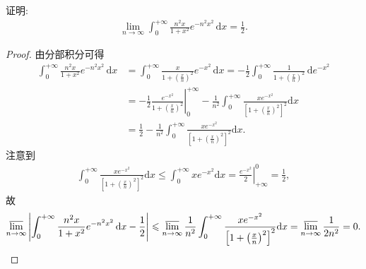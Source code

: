 \documentclass[../../main.tex]{subfiles}%
\begin{document}
\begin{example}
证明:
\begin{align*}
\lim_{n \to \infty} \int_0^{+\infty} \frac{n^2 x}{1 + x^2} e^{-n^2 x^2} \, \mathrm{d}x = \frac{1}{2}.
\end{align*}
\end{example}
\begin{proof}

由分部积分可得
\begin{align*}
\int_0^{+\infty} \frac{n^2 x}{1 + x^2} e^{-n^2 x^2} \, \mathrm{d}x &= \int_0^{+\infty} \frac{x}{1 + \left( \frac{x}{n} \right)^2} e^{-x^2} \, \mathrm{d}x = -\frac{1}{2} \int_0^{+\infty} \frac{1}{1 + \left( \frac{x}{n} \right)^2} \, \mathrm{d}e^{-x^2} \\
&= -\frac{1}{2} \left. \frac{e^{-x^2}}{1 + \left( \frac{x}{n} \right)^2} \right|_0^{+\infty} - \frac{1}{n^2} \int_0^{+\infty} \frac{x e^{-x^2}}{\left[ 1 + \left( \frac{x}{n} \right)^2 \right]^2} \mathrm{d}x \\
&= \frac{1}{2} - \frac{1}{n^2} \int_0^{+\infty} \frac{x e^{-x^2}}{\left[ 1 + \left( \frac{x}{n} \right)^2 \right]^2} \mathrm{d}x.
\end{align*}
注意到
\begin{align*}
\int_0^{+\infty} \frac{x e^{-x^2}}{\left[ 1 + \left( \frac{x}{n} \right)^2 \right]^2} \mathrm{d}x \leqslant \int_0^{+\infty} x e^{-x^2} \mathrm{d}x = \left. \frac{e^{-x^2}}{2} \right|_{+\infty}^0 = \frac{1}{2},
\end{align*}
故
\begin{align*}
\varlimsup_{n \to \infty} \left| \int_0^{+\infty} \frac{n^2 x}{1 + x^2} e^{-n^2 x^2} \, \mathrm{d}x - \frac{1}{2} \right| \leqslant \varlimsup_{n \to \infty} \frac{1}{n^2} \int_0^{+\infty} \frac{x e^{-x^2}}{\left[ 1 + \left( \frac{x}{n} \right)^2 \right]^2} \mathrm{d}x = \varlimsup_{n \to \infty} \frac{1}{2n^2} = 0.
\end{align*}
\end{proof}
\end{document}
